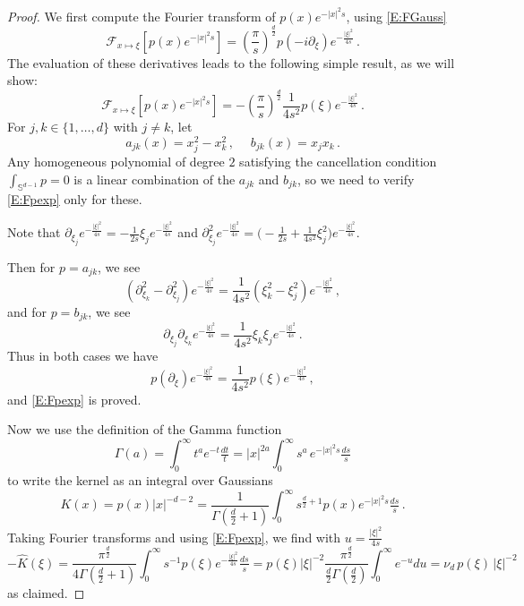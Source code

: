 \documentclass[12pt]{amsart}
\theoremstyle{definition}
\theoremstyle{remark}
\numberwithin{equation}{section}
\renewcommand\SS{{\mathbb S}}
\newcommand{\sF}{{\mathscr F}}
\let\hat=\widehat
\begin{document}
\begin{proof}
We first compute the Fourier transform of $p(x)e^{-|x|^{2}s}$, using \eqref{E:FGauss}
$$
 \sF_{x\mapsto\xi}[p(x)e^{-|x|^{2}s}] = 
 (\frac\pi s)^{\frac d2} p(-i\partial_{\xi}) e^{-\frac{|\xi|^{2}}{4s}} \,.
$$
The evaluation of these derivatives leads to the following simple result, as we will show:
\begin{equation}
\label{E:Fpexp}
 \sF_{x\mapsto\xi}[p(x)e^{-|x|^{2}s}] = -(\frac\pi s)^{\frac d2}\frac1{4s^{2}} p(\xi) e^{-\frac{|\xi|^{2}}{4s}}\,.
\end{equation}
For $j,k\in\{1,\dots,d\}$ with $j\ne k$, let
\begin{equation}
\label{E:ajk,bjk}
  a_{jk}(x)=x_{j}^{2}-x_{k}^{2}\,,\;\quad  b_{jk}(x)=x_{j}x_{k}\,.
\end{equation}
Any homogeneous polynomial of degree $2$ satisfying the cancellation condition $\int_{\SS^{d-1}}p=0$ is a linear combination of the $a_{jk}$ and $b_{jk}$, so we need to verify \eqref{E:Fpexp} only for these.

Note that $\partial_{\xi_{j}}e^{-\frac{|\xi|^{2}}{4s}} 
 = -\frac1{2s}\xi_{j} e^{-\frac{|\xi|^{2}}{4s}}$ and
$\partial_{\xi_{j}}^{2}e^{-\frac{|\xi|^{2}}{4s}} 
 = \big(-\frac1{2s}+ \frac1{4s^{2}}\xi_{j}^{2}\big) e^{-\frac{|\xi|^{2}}{4s}}$.
 
Then for $p=a_{jk}$, we see
$$
  (\partial_{\xi_{k}}^{2}-\partial_{\xi_{j}}^{2}) e^{-\frac{|\xi|^{2}}{4s}} =
  \frac1{4s^{2}}(\xi_{k}^{2}-\xi_{j}^{2}) e^{-\frac{|\xi|^{2}}{4s}}\,,
$$
and for $p=b_{jk}$, we see
$$
  \partial_{\xi_{j}}\partial_{\xi_{k}} e^{-\frac{|\xi|^{2}}{4s}} =
  \frac1{4s^{2}}\xi_{k}\xi_{j} e^{-\frac{|\xi|^{2}}{4s}}\,.
$$
Thus in both cases we have
\begin{equation}
\label{E:p(dxi)Gauss}
 p(\partial_{\xi}) e^{-\frac{|\xi|^{2}}{4s}} =
 \frac1{4s^{2}} p(\xi) e^{-\frac{|\xi|^{2}}{4s}}\,,
\end{equation}
and \eqref{E:Fpexp} is proved.

Now we use the definition of the Gamma function
$$
 \Gamma(a) = \int_{0}^{\infty}t^{a}e^{-t}\tfrac{dt}{t}
  = |x|^{2a}\int_{0}^{\infty} s^{a}\,e^{-|x|^{2}s}\tfrac{ds}{s}
$$
to write the kernel as an integral over Gaussians
\begin{equation}
\label{E:K=Gauss}
 K(x) = p(x)|x|^{-d-2} = 
 \frac1{\Gamma(\frac d2+1)}\int_{0}^{\infty} s^{\frac d2+1}p(x)e^{-|x|^{2}s}\tfrac{ds}{s}\,.
\end{equation}
Taking Fourier transforms and using \eqref{E:Fpexp}, we find with $u=\frac{|\xi|^{2}
}{4s}$
\begin{equation}
\label{E:KhatGauss}
-\hat K(\xi) = 
\frac{\pi^{\frac d2}}{4\Gamma(\frac d2+1)}\int_{0}^{\infty}\!\!\!\! s^{-1}p(\xi)e^{-\frac{|\xi|^{2}}{4s}}\tfrac{ds}{s}
= p(\xi) |\xi|^{-2} \frac{\pi^{\frac d2}}{\frac d2\Gamma(\frac d2)}\int_{0}^{\infty}\!\!\!\!  e^{-u}du
= \nu_{d}  \,p(\xi) \,|\xi|^{-2}
\end{equation}
as claimed.
\end{proof}
\end{document}
